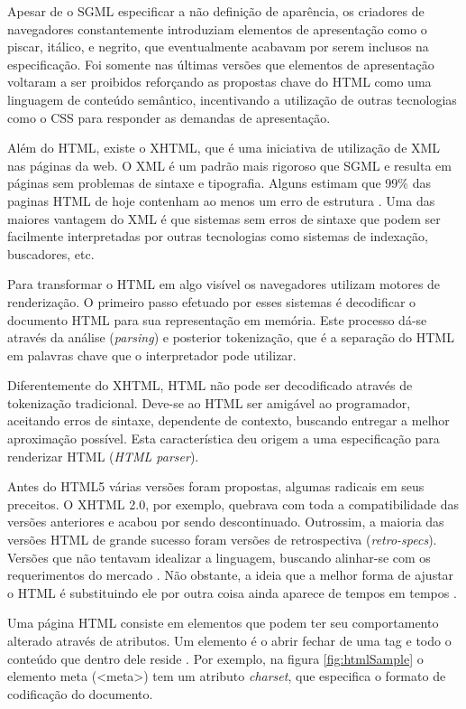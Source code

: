 Apesar de o SGML especificar a não definição de aparência, os criadores de
navegadores constantemente introduziam elementos de apresentação como o
piscar, itálico, e negrito, que eventualmente acabavam por serem inclusos
na especificação. Foi somente nas últimas versões que elementos de
apresentação voltaram a ser proibidos reforçando as propostas chave
do HTML como uma linguagem de conteúdo semântico, incentivando a
utilização de outras tecnologias como o CSS para responder as demandas de
apresentação.

Além do HTML, existe o XHTML, que é uma iniciativa de utilização de
XML nas páginas da web. O XML é um padrão mais rigoroso que SGML e
resulta em páginas sem problemas de sintaxe e tipografia. 
Alguns estimam que 99\% das paginas HTML de hoje
contenham ao menos um erro de estrutura \autocite{diveIntohtml}.
Uma das maiores vantagem do XML é que sistemas sem erros de sintaxe
que podem ser facilmente interpretadas por outras tecnologias como
sistemas de indexação, buscadores, etc.

Para transformar o HTML em algo visível os navegadores utilizam
motores de renderização. O primeiro passo efetuado por esses sistemas
é decodificar o documento HTML para sua representação em memória.
Este processo dá-se através da análise (\textit{parsing}) e posterior
tokenização, que é a separação do HTML em palavras chave que o
interpretador pode utilizar.

Diferentemente do XHTML, HTML não pode ser decodificado através de
tokenização tradicional. Deve-se ao HTML ser amigável ao programador,
aceitando erros de sintaxe, dependente de contexto, buscando entregar a
melhor aproximação possível. Esta característica deu origem a uma
especificação para renderizar HTML (\textit{HTML parser}).

Antes do HTML5 várias versões foram propostas, algumas radicais
em seus preceitos. O XHTML 2.0, por exemplo, quebrava com toda
a compatibilidade das versões anteriores e acabou por sendo descontinuado.
Outrossim, a maioria das versões HTML de grande sucesso foram versões de
retrospectiva (\textit{retro-specs}). Versões que não tentavam
idealizar a linguagem, buscando alinhar-se com os requerimentos do
mercado \autocite{diveIntohtml}. Não obstante, a ideia que a melhor forma
de ajustar o HTML é substituindo ele por outra coisa ainda aparece de tempos
em tempos \autocite{diveIntohtml}.

Uma página HTML consiste em elementos que podem ter seu comportamento
alterado através de atributos. Um elemento é o abrir fechar de
uma tag e todo o conteúdo que dentro dele reside \autocite[pp.
10--11]{htmlAndCssDucket}. Por exemplo, na figura \ref{fig:htmlSample} o elemento
meta (<meta>) tem um atributo \textit{charset}, que especifica o formato de 
codificação do documento.

